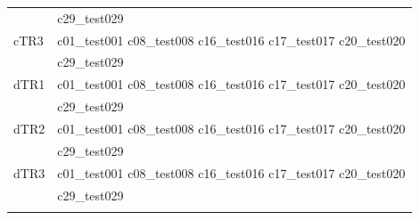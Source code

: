 \begin{longtable}{ll}
 & c29\_test029 \\
cTR3 & c01\_test001 c08\_test008 c16\_test016 c17\_test017 c20\_test020 \\ 
 & c29\_test029 \\
dTR1 & c01\_test001 c08\_test008 c16\_test016 c17\_test017 c20\_test020 \\ 
 & c29\_test029 \\
dTR2 & c01\_test001 c08\_test008 c16\_test016 c17\_test017 c20\_test020 \\ 
 & c29\_test029 \\
dTR3 & c01\_test001 c08\_test008 c16\_test016 c17\_test017 c20\_test020 \\ 
 & c29\_test029 \\

\hline \\
\end{longtable}
